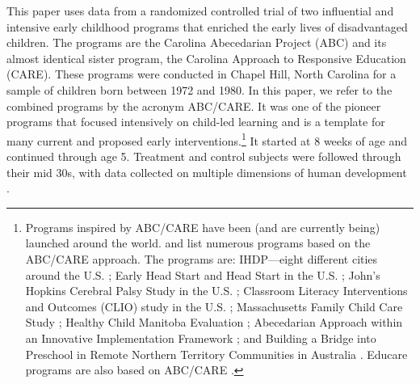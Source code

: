 This paper uses data from a randomized controlled trial of two influential and intensive early childhood programs that enriched the early lives of disadvantaged children. The programs are the Carolina Abecedarian Project (ABC) and its almost identical sister program, the Carolina Approach to Responsive Education (CARE). These programs were conducted in Chapel Hill, North Carolina for a sample of children born between 1972 and 1980. In this paper, we refer to the combined programs by the acronym ABC/CARE. It was one of the pioneer programs that focused intensively on child-led learning and is a template for many current and proposed early interventions.\footnote{Programs inspired by ABC/CARE have been (and are currently being) launched around the world. \citet{Sparling_2010_Highlights} and \citet{Ramey_Ramey_Lanzi_2014_Interventions} list numerous programs based on the ABC/CARE approach. The programs are: IHDP---eight different cities around the U.S. \citep{Spiker-etal_1997_Helping}; Early Head Start and Head Start in the U.S. \citep{Schneider_McDonald-eds_2007_Scale-Up_Vol-1}; John's Hopkins Cerebral Palsy Study in the U.S. \citep{Sparling_2010_Highlights}; Classroom Literacy Interventions and Outcomes (CLIO) study in the U.S. \citep{Sparling_2010_Highlights}; Massachusetts Family Child Care Study \citep{Collins_etal_2010_Massachusetts-Study}; Healthy Child Manitoba Evaluation \citep{Healthy_Child_Manitoba_2015_Starting-Early}; Abecedarian Approach within an Innovative Implementation Framework \citep{Jensen_Nielsen_2016_ABC-Programme-Pilot}; and Building a Bridge into Preschool in Remote Northern Territory Communities in Australia \citep{UMonash_Dataset_2015_URL}. Educare programs are also based on ABC/CARE \citep{Educare_2014_Research_Agenda,Yazejian_Bryant_2012_Educare}.} It started at 8 weeks of age and continued through age 5. Treatment and control subjects were followed through their mid 30s, with data collected on multiple dimensions of human development \citep{Ramey_Campbell_1991_childreninpoverty}. 

